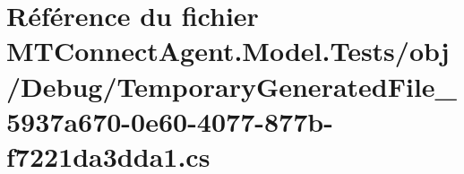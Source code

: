 \hypertarget{_m_t_connect_agent_8_model_8_tests_2obj_2_debug_2_temporary_generated_file__5937a670-0e60-4077-877b-f7221da3dda1_8cs}{}\section{Référence du fichier M\+T\+Connect\+Agent.\+Model.\+Tests/obj/\+Debug/\+Temporary\+Generated\+File\+\_\+5937a670-\/0e60-\/4077-\/877b-\/f7221da3dda1.cs}
\label{_m_t_connect_agent_8_model_8_tests_2obj_2_debug_2_temporary_generated_file__5937a670-0e60-4077-877b-f7221da3dda1_8cs}
